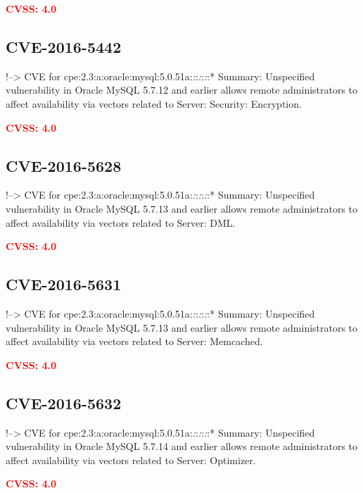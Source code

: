 \documentclass[a4paper, 12pt]{article}
\begin{document}
\textbf{\textcolor{red}{CVSS: 4.0}}

\hypertarget{cve-2016-5442}{%
\subsection{CVE-2016-5442}\label{cve-2016-5442}}

!--\textgreater{} CVE for
cpe:2.3:a:oracle:mysql:5.0.51a:\emph{:}:\emph{:}:\emph{:}:* Summary:
Unspecified vulnerability in Oracle MySQL 5.7.12 and earlier allows
remote administrators to affect availability via vectors related to
Server: Security: Encryption.

\textbf{\textcolor{red}{CVSS: 4.0}}

\hypertarget{cve-2016-5628}{%
\subsection{CVE-2016-5628}\label{cve-2016-5628}}

!--\textgreater{} CVE for
cpe:2.3:a:oracle:mysql:5.0.51a:\emph{:}:\emph{:}:\emph{:}:* Summary:
Unspecified vulnerability in Oracle MySQL 5.7.13 and earlier allows
remote administrators to affect availability via vectors related to
Server: DML.

\textbf{\textcolor{red}{CVSS: 4.0}}

\hypertarget{cve-2016-5631}{%
\subsection{CVE-2016-5631}\label{cve-2016-5631}}

!--\textgreater{} CVE for
cpe:2.3:a:oracle:mysql:5.0.51a:\emph{:}:\emph{:}:\emph{:}:* Summary:
Unspecified vulnerability in Oracle MySQL 5.7.13 and earlier allows
remote administrators to affect availability via vectors related to
Server: Memcached.

\textbf{\textcolor{red}{CVSS: 4.0}}

\hypertarget{cve-2016-5632}{%
\subsection{CVE-2016-5632}\label{cve-2016-5632}}

!--\textgreater{} CVE for
cpe:2.3:a:oracle:mysql:5.0.51a:\emph{:}:\emph{:}:\emph{:}:* Summary:
Unspecified vulnerability in Oracle MySQL 5.7.14 and earlier allows
remote administrators to affect availability via vectors related to
Server: Optimizer.

\textbf{\textcolor{red}{CVSS: 4.0}}
\end{document}
